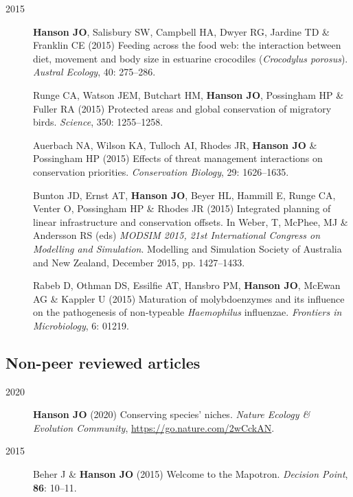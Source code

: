 \documentclass[12pt,a4paper]{article}
\begin{document}
\begin{description}
\item[2015] \textbf{Hanson JO}, Salisbury SW, Campbell HA, Dwyer RG, Jardine TD \& Franklin CE (2015) Feeding across the food web: the interaction between diet, movement and body size in estuarine crocodiles (\textit{Crocodylus porosus}). \textit{Austral Ecology}, 40: 275--286.

\item[] Runge CA, Watson JEM, Butchart HM, \textbf{Hanson JO}, Possingham HP \& Fuller RA (2015) Protected areas and global conservation of migratory birds. \textit{Science}, 350: 1255--1258.

Auerbach NA, Wilson KA, Tulloch AI, Rhodes JR, \textbf{Hanson JO} \& Possingham HP (2015) Effects of threat management interactions on conservation priorities. \textit{Conservation Biology}, 29: 1626--1635.

\item[] Bunton JD, Ernst AT, \textbf{Hanson JO}, Beyer HL, Hammill E, Runge CA, Venter O, Possingham HP \& Rhodes JR (2015) Integrated planning of linear infrastructure and conservation offsets. In Weber, T, McPhee, MJ \& Andersson RS (eds) \textit{MODSIM 2015, 21st International Congress on Modelling and Simulation}. Modelling and Simulation Society of Australia and New Zealand, December 2015, pp. 1427--1433.

\item[] Rabeb D, Othman DS, Essilfie AT, Hansbro PM, \textbf{Hanson JO}, McEwan AG \& Kappler U (2015) Maturation of molybdoenzymes and its influence on the pathogenesis of non-typeable \textit{Haemophilus} influenzae. \textit{Frontiers in Microbiology}, 6: 01219.

\end{description}

\subsection*{Non-peer reviewed articles}
\begin{description}

\item[2020] \textbf{Hanson JO} (2020) Conserving species' niches. \textit{Nature Ecology \& Evolution Community}, \url{https://go.nature.com/2wCckAN}.

\item[2015] Beher J \& \textbf{Hanson JO} (2015) Welcome to the Mapotron. \textit{Decision Point}, \textbf{86}: 10--11.

\end{description}
\end{document}
